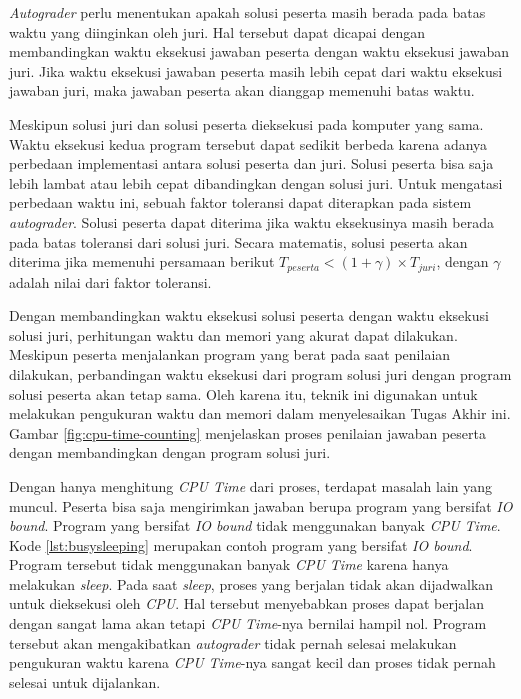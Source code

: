 \par \textit{Autograder} perlu menentukan apakah solusi peserta masih berada pada batas waktu yang diinginkan oleh juri. Hal tersebut dapat dicapai dengan membandingkan waktu eksekusi jawaban peserta dengan waktu eksekusi jawaban juri. Jika waktu eksekusi jawaban peserta masih lebih cepat dari waktu eksekusi jawaban juri, maka jawaban peserta akan dianggap memenuhi batas waktu.

\par Meskipun solusi juri dan solusi peserta dieksekusi pada komputer yang sama. Waktu eksekusi kedua program tersebut dapat sedikit berbeda karena adanya perbedaan implementasi antara solusi peserta dan juri. Solusi peserta bisa saja lebih lambat atau lebih cepat dibandingkan dengan solusi juri. Untuk mengatasi perbedaan waktu ini, sebuah faktor toleransi dapat diterapkan pada sistem \textit{autograder}. Solusi peserta dapat diterima jika waktu eksekusinya masih berada pada batas toleransi dari solusi juri. Secara matematis, solusi peserta akan diterima jika memenuhi persamaan berikut $ T_{peserta} < (1 + \gamma) \times T_{juri}$, dengan $\gamma$ adalah nilai dari faktor toleransi.

\par Dengan membandingkan waktu eksekusi solusi peserta dengan waktu eksekusi solusi juri, perhitungan waktu dan memori yang akurat dapat dilakukan. Meskipun peserta menjalankan program yang berat pada saat penilaian dilakukan, perbandingan waktu eksekusi dari program solusi juri dengan program solusi peserta akan tetap sama. Oleh karena itu, teknik ini digunakan untuk melakukan pengukuran waktu dan memori dalam menyelesaikan Tugas Akhir ini. Gambar \ref{fig:cpu-time-counting} menjelaskan proses penilaian jawaban peserta dengan membandingkan dengan program solusi juri. 



\par Dengan hanya menghitung \textit{CPU Time} dari proses, terdapat masalah lain yang muncul. Peserta bisa saja mengirimkan jawaban berupa program yang bersifat \textit{IO bound}. Program yang bersifat \textit{IO bound} tidak menggunakan banyak \textit{CPU Time}. Kode \ref{lst:busysleeping} merupakan contoh program yang bersifat \textit{IO bound}. Program tersebut tidak menggunakan banyak \textit{CPU Time} karena hanya melakukan \textit{sleep}. Pada saat \textit{sleep}, proses yang berjalan tidak akan dijadwalkan untuk dieksekusi oleh \textit{CPU}. Hal tersebut menyebabkan proses dapat berjalan dengan sangat lama akan tetapi \textit{CPU Time}-nya bernilai hampil nol. Program tersebut akan mengakibatkan \textit{autograder} tidak pernah selesai melakukan pengukuran waktu karena \textit{CPU Time}-nya sangat kecil dan proses tidak pernah selesai untuk dijalankan.

